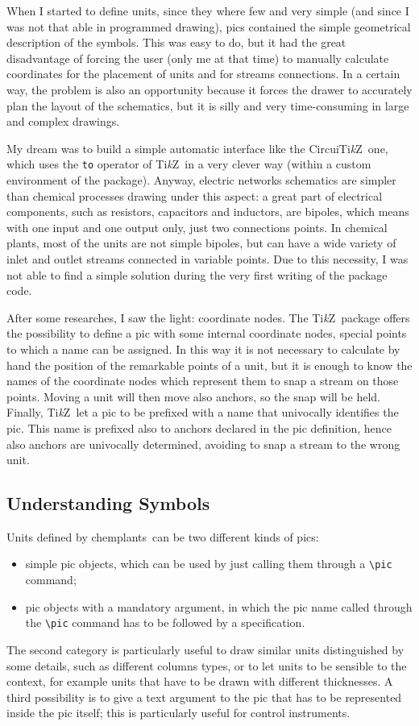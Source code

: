 \documentclass[12pt]{article}						%
\newcommand*{\chemplants}{chemplants}
\newcommand*{\TikZ}{Ti\textit{k}Z}
\newcommand*{\CircuiTikZ}{Circui\TikZ}
\begin{document}
When I started to define units, since they where few and very simple (and since I
was not that able in programmed drawing), pics contained the simple geometrical
description of the symbols. This was easy to do, but it had the great
disadvantage of forcing the user (only me at that time) to manually calculate
coordinates for the placement of units and for streams connections. In a certain
way, the problem is also an opportunity because it forces the drawer to
accurately plan the layout of the schematics, but it is silly and very
time-consuming in large and complex drawings.

My dream was to build a simple automatic interface like the \CircuiTikZ\
one, which uses the \verb|to| operator of \TikZ\ in a very clever way (within a
custom environment of the package). Anyway, electric networks schematics are
simpler than chemical processes drawing under this aspect: a great part of
electrical components, such as resistors, capacitors and inductors, are bipoles,
which means with one input and one output only, just two connections points. In
chemical plants, most of the units are not simple bipoles, but can have a wide
variety of inlet and outlet streams connected in variable points. Due to this
necessity, I was not able to find a simple solution during the very first writing
of the package code.

After some researches, I saw the light: coordinate nodes. The \TikZ\ package
offers the possibility to define a pic with some internal coordinate nodes,
special points to which a name can be assigned. In this way it is not necessary
to calculate by hand the position of the remarkable points of a unit, but it is
enough to know the names of the coordinate nodes which represent them to snap a
stream on those points. Moving a unit will then move also anchors, so the snap
will be held. Finally, \TikZ\ let a pic to be prefixed with a name that
univocally identifies the pic. This name is prefixed also to anchors declared
in the pic definition, hence also anchors are univocally determined, avoiding to
snap a stream to the wrong unit.

\subsection{Understanding Symbols}

Units defined by \chemplants\ can be two different kinds of pics:
\begin{itemize}
	\item simple pic objects, which can be used by just calling them through a
		\verb|\pic| command;
	\item pic objects with a mandatory argument, in which the pic name called
		through the \verb|\pic| command has to be followed by a specification.
\end{itemize}
The second category is particularly useful to draw similar units distinguished
by some details, such as different columns types, or to let units to be
sensible to the context, for example units that have to be drawn with different
thicknesses. A third possibility is to give a text argument to the pic that has
to be represented inside the pic itself; this is particularly useful for control
instruments.
\end{document}
